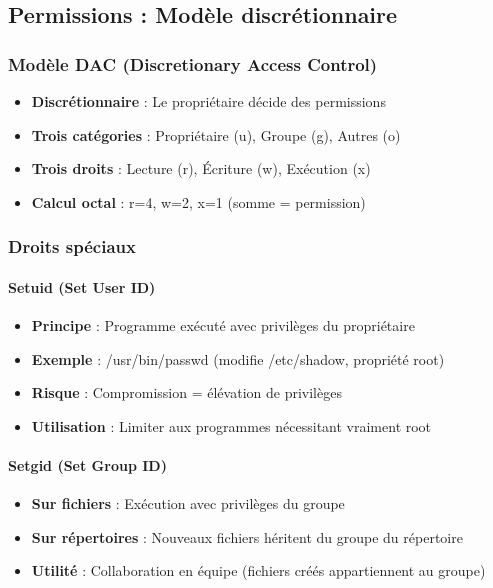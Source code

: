 \documentclass[12pt,a4paper]{article}
\begin{document}
\subsection{Permissions : Modèle discrétionnaire}

\subsubsection{Modèle DAC (Discretionary Access Control)}

\begin{itemize}
    \item \textbf{Discrétionnaire} : Le propriétaire décide des permissions
    \item \textbf{Trois catégories} : Propriétaire (u), Groupe (g), Autres (o)
    \item \textbf{Trois droits} : Lecture (r), Écriture (w), Exécution (x)
    \item \textbf{Calcul octal} : r=4, w=2, x=1 (somme = permission)
\end{itemize}

\subsubsection{Droits spéciaux}

\paragraph{Setuid (Set User ID)}
\begin{itemize}
    \item \textbf{Principe} : Programme exécuté avec privilèges du propriétaire
    \item \textbf{Exemple} : /usr/bin/passwd (modifie /etc/shadow, propriété root)
    \item \textbf{Risque} : Compromission = élévation de privilèges
    \item \textbf{Utilisation} : Limiter aux programmes nécessitant vraiment root
\end{itemize}

\paragraph{Setgid (Set Group ID)}
\begin{itemize}
    \item \textbf{Sur fichiers} : Exécution avec privilèges du groupe
    \item \textbf{Sur répertoires} : Nouveaux fichiers héritent du groupe du répertoire
    \item \textbf{Utilité} : Collaboration en équipe (fichiers créés appartiennent au groupe)
\end{itemize}
\end{document}
